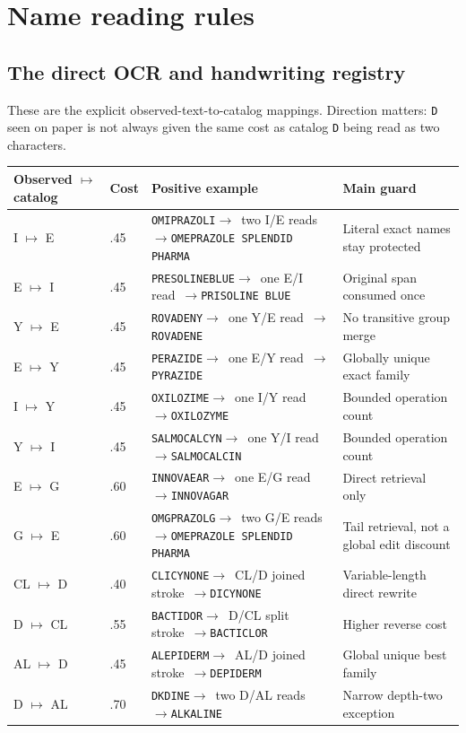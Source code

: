 \documentclass[10pt,a4paper]{article}
\newcommand{\observed}[1]{\texttt{#1}}
\newcommand{\mapstoex}{\ensuremath{\longrightarrow}}
\newcommand{\caseflow}[3]{%
  \texttt{#1}\enspace\textcolor{Muted}{\mapstoex\ #2\ \mapstoex}\enspace\texttt{#3}}
\begin{document}
\section{Name reading rules}

\subsection{The direct OCR and handwriting registry}

These are the explicit observed-text-to-catalog mappings. Direction matters:
\observed{D} seen on paper is not always given the same cost as catalog
\observed{D} being read as two characters.

\begin{longtable}{@{}L{28mm}L{17mm}L{77mm}L{40mm}@{}}
\toprule
Observed $\mapsto$ catalog & Cost & Positive example & Main guard \\
\midrule
\endhead
I $\mapsto$ E & .45 & \caseflow{OMIPRAZOLI}{two I/E reads}{OMEPRAZOLE SPLENDID PHARMA} & Literal exact names stay protected \\
E $\mapsto$ I & .45 & \caseflow{PRESOLINEBLUE}{one E/I read}{PRISOLINE BLUE} & Original span consumed once \\
Y $\mapsto$ E & .45 & \caseflow{ROVADENY}{one Y/E read}{ROVADENE} & No transitive group merge \\
E $\mapsto$ Y & .45 & \caseflow{PERAZIDE}{one E/Y read}{PYRAZIDE} & Globally unique exact family \\
I $\mapsto$ Y & .45 & \caseflow{OXILOZIME}{one I/Y read}{OXILOZYME} & Bounded operation count \\
Y $\mapsto$ I & .45 & \caseflow{SALMOCALCYN}{one Y/I read}{SALMOCALCIN} & Bounded operation count \\
E $\mapsto$ G & .60 & \caseflow{INNOVAEAR}{one E/G read}{INNOVAGAR} & Direct retrieval only \\
G $\mapsto$ E & .60 & \caseflow{OMGPRAZOLG}{two G/E reads}{OMEPRAZOLE SPLENDID PHARMA} & Tail retrieval, not a global edit discount \\
CL $\mapsto$ D & .40 & \caseflow{CLICYNONE}{CL/D joined stroke}{DICYNONE} & Variable-length direct rewrite \\
D $\mapsto$ CL & .55 & \caseflow{BACTIDOR}{D/CL split stroke}{BACTICLOR} & Higher reverse cost \\
AL $\mapsto$ D & .45 & \caseflow{ALEPIDERM}{AL/D joined stroke}{DEPIDERM} & Global unique best family \\
D $\mapsto$ AL & .70 & \caseflow{DKDINE}{two D/AL reads}{ALKALINE} & Narrow depth-two exception \\
\bottomrule
\end{longtable}
\end{document}
